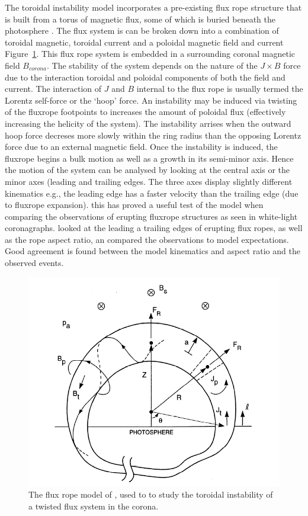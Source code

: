 The toroidal instability model incorporates a pre-existing flux rope structure that is built from a torus of magnetic flux, some of which is buried beneath the photosphere \citep{chen1989}. The flux system is can be broken down into a combination of toroidal magnetic, toroidal current and a poloidal magnetic field and current Figure~\ref{fig:chen_model}. This flux rope system is embedded in a surrounding coronal magnetic field $B_{corona}$. The stability of the system depends on the nature of the $J \times B$ force due to the interaction toroidal and poloidal components of both the field and current. The interaction of $J$ and $B$ internal to the flux rope is usually termed the Lorentz self-force or the \textquoteleft hoop' force. An instability may be induced via twisting of the fluxrope footpoints to increases the amount of poloidal flux (effectively increasing the helicity of the system). The instability arrises when the outward hoop force decreses more slowly within the ring radius than the opposing Lorentz force due to an external magnetic field. Once the instability is induced, the fluxrope begins a bulk motion as well as a growth in its semi-minor axis. Hence the motion of the system can be analysed by looking at the central axis or the minor axes (leading and trailing edges. The three axes display slightly different kinematics e.g., the leading edge has a faster velocity than the trailing edge (due to fluxrope expansion). this has proved a useful test of the model when comparing the observations of erupting fluxrope structures as seen in white-light coronagraphs. \citet{krall2001} looked at the leading a trailing edges of erupting flux ropes, as well as the rope aspect ratio, an compared the observations to model expectations. Good agreement is found between the model kinematics and aspect ratio and the observed events.
\begin{figure}[!t]
\begin{center}
\includegraphics[scale=0.5]{images/chen_model}
\caption{The flux rope model of \citet{chen1989}, used to to study the toroidal instability of a twisted flux system in the corona.}
\label{fig:chen_model}
\end{center}
\end{figure}
